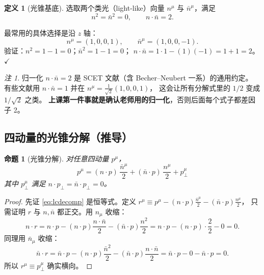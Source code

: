 \documentclass[UTF8,a4paper,11pt]{ctexart}
\theoremstyle{definition}
\newtheorem{definition}{定义}[section]
\theoremstyle{remark}
\newtheorem{remark}{注}[section]
\theoremstyle{plain}
\newtheorem{proposition}{命题}[section]
\newcommand{\en}[1]{\textsf{#1}}   %
\begin{document}
\begin{definition}[光锥基底]
选取两个类光（\en{light-like}）向量 $n^\mu$ 与 $\bar n^\mu$，满足
\begin{equation}
  n^2=\bar n^2=0,
  \qquad
  n\cdot\bar n=2 .
  \label{eq:nnbar}
\end{equation}
\end{definition}

最常用的具体选择是沿 $z$ 轴：
\begin{equation}
  n^\mu=(1,0,0,1),
  \qquad
  \bar n^\mu=(1,0,0,-1).
  \label{eq:nexplicit}
\end{equation}
验证：$n^2=1-1=0$；$\bar n^2=1-1=0$；
$n\cdot\bar n=1\cdot1-(1)(-1)=1+1=2$。$\checkmark$

\begin{remark}
归一化 $n\cdot\bar n=2$ 是 SCET 文献（含 Becher--Neubert 一系）的通用约定。
有些文献用 $n\cdot\bar n=1$ 并在 $n^\mu=\frac{1}{\sqrt2}(1,0,0,1)$，
这会让所有分解式里的 $1/2$ 变成 $1/\sqrt2$ 之类。
\textbf{上课第一件事就是确认老师用的归一化}，否则后面每个式子都差因子 2。
\end{remark}

\subsection{四动量的光锥分解（推导）}
\label{subsec:decomp}

\begin{proposition}[光锥分解]
对任意四动量 $p^\mu$，
\begin{equation}
  \boxed{\;
  p^\mu=(n\cdot p)\,\frac{\bar n^\mu}{2}
        +(\bar n\cdot p)\,\frac{n^\mu}{2}
        +p_\perp^\mu \;}
  \label{eq:lcdecomp}
\end{equation}
其中 $p_\perp^\mu$ 满足 $n\cdot p_\perp=\bar n\cdot p_\perp=0$。
\end{proposition}

\begin{proof}
先证 \eqref{eq:lcdecomp} 是恒等式。定义
$r^\mu\equiv p^\mu-(n\cdot p)\frac{\bar n^\mu}{2}-(\bar n\cdot p)\frac{n^\mu}{2}$，
只需证明 $r$ 与 $n,\bar n$ 都正交。用 $n_\mu$ 收缩：
\begin{equation}
  n\cdot r
  = n\cdot p-(n\cdot p)\frac{n\cdot\bar n}{2}-(\bar n\cdot p)\frac{n^2}{2}
  = n\cdot p-(n\cdot p)\cdot\frac{2}{2}-0
  = 0 .
\end{equation}
同理用 $\bar n_\mu$ 收缩：
\begin{equation}
  \bar n\cdot r
  = \bar n\cdot p-(n\cdot p)\frac{\bar n^2}{2}-(\bar n\cdot p)\frac{n\cdot\bar n}{2}
  = \bar n\cdot p-0-\bar n\cdot p=0 .
\end{equation}
所以 $r^\mu\equiv p_\perp^\mu$ 确实横向。
\end{proof}
\end{document}
